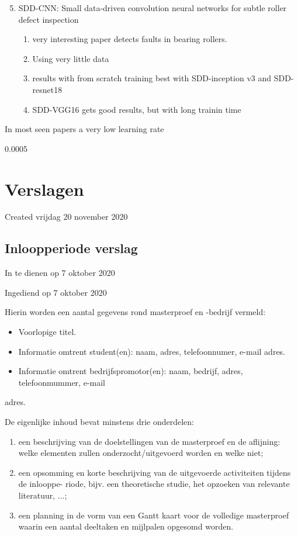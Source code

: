 \documentclass{article}
\begin{document}
\begin{enumerate}[1]
\setcounter{enumi}{4}
\item SDD-CNN: Small data-driven convolution neural networks for subtle roller defect inspection
	\begin{enumerate}[a]
	\item very interesting paper detects faults in bearing rollers. 
	\item Using very little data
	\item results with from scratch training best with SDD-inception v3 and SDD-resnet18
	\item SDD-VGG16 gets good results, but with long trainin time
	\end{enumerate}
\end{enumerate}


In most seen papers a very low learning rate 

0.0005 








		\section{Verslagen}

Created vrijdag 20 november 2020



\subsection{Inloopperiode verslag}

In te dienen op 7 oktober 2020

Ingediend op 7 oktober 2020



Hierin worden een aantal gegevens rond masterproef en -bedrijf vermeld:

\begin{itemize}
\item Voorlopige titel.
\item Informatie omtrent student(en): naam, adres, telefoonnumer, e-mail adres.
\item Informatie omtrent bedrijfspromotor(en): naam, bedrijf, adres, telefoonmummer, e-mail
\end{itemize}
adres.

De eigenlijke inhoud bevat minstens drie onderdelen:

\begin{enumerate}[1]
\item een beschrijving van de doelstellingen van de masterproef en de aflijning: welke elementen zullen onderzocht/uitgevoerd worden en welke niet;
\item een opsomming en korte beschrijving van de uitgevoerde activiteiten tijdens de inlooppe- riode, bijv. een theoretische studie, het opzoeken van relevante literatuur, ...;
\item een planning in de vorm van een Gantt kaart voor de volledige masterproef waarin een aantal deeltaken en mijlpalen opgesomd worden.
\end{enumerate}
\end{document}
